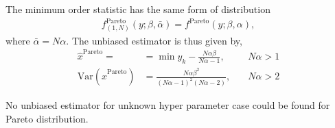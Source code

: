 \documentclass[journal]{IEEEtran}
\newcommand{\Var}{\mathrm{Var}}
\begin{document}
%
%
The minimum order statistic has the same form of distribution
%
%
\begin{align}
f^{\mathrm{Pareto}}_{(1,N)}(y;\beta,\bar{\alpha}) = f^{\mathrm{Pareto}}(y;\beta,\alpha),
\end{align}
%
%
where $\bar{\alpha}=N\alpha$. The unbiased estimator is thus given by,
%
%
\begin{subequations}
	\begin{align}
	\hat{x}^{\mathrm{Pareto}} = &= \min y_k - \frac{N\alpha\beta}{N\alpha-1},&\quad N\alpha>1
	\\
	\Var(\hat{x}^{\mathrm{Pareto}}) &=\frac{N\alpha\beta^2}{(N\alpha-1)^2(N\alpha-2)},&\quad N\alpha>2
	\end{align}
\end{subequations}
%
%

No unbiased estimator for unknown hyper parameter case could be found for Pareto distribution. 
\end{document}
